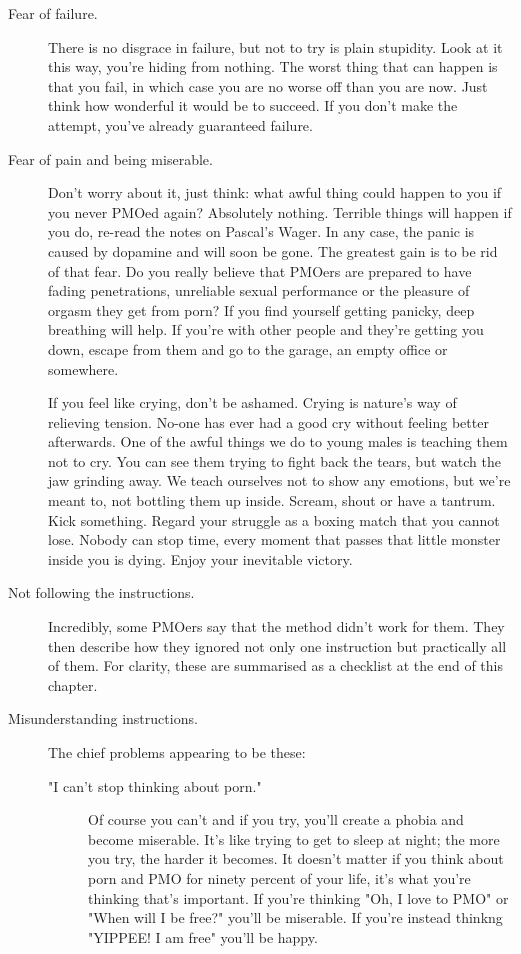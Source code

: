 \documentclass[easypeasy.tex]{subfiles}
\begin{document}
\begin{description}
  \item [Fear of failure.] There is no disgrace in failure, but not to try is plain stupidity. Look at it this way, you're hiding from nothing. The worst thing that can happen is that you fail, in which case you are no worse off than you are now. Just think how wonderful it would be to succeed. If you don't make the attempt, you've already guaranteed failure.

  \item [Fear of pain and being miserable.] Don't worry about it, just think: what awful thing could happen to you if you never PMOed again? Absolutely nothing. Terrible things will happen if you do, re-read the notes on Pascal's Wager. In any case, the panic is caused by dopamine and will soon be gone. The greatest gain is to be rid of that fear. Do you really believe that PMOers are prepared to have fading penetrations, unreliable sexual performance or the pleasure of orgasm they get from porn? If you find yourself getting panicky, deep breathing will help. If you're with other people and they're getting you down, escape from them and go to the garage, an empty office or somewhere.

  If you feel like crying, don't be ashamed. Crying is nature's way of relieving tension. No-one has ever had a good cry without feeling better afterwards. One of the awful things we do to young males is teaching them not to cry. You can see them trying to fight back the tears, but watch the jaw grinding away. We teach ourselves not to show any emotions, but we're meant to, not bottling them up inside. Scream, shout or have a tantrum. Kick something. Regard your struggle as a boxing match that you cannot lose. Nobody can stop time, every moment that passes that little monster inside you is dying. Enjoy your inevitable victory. 

  \item [Not following the instructions.] Incredibly, some PMOers say that the method didn't work for them. They then describe how they ignored not only one instruction but practically all of them. For clarity, these are summarised as a checklist at the end of this chapter.

  \item [Misunderstanding instructions.] The chief problems appearing to be these:

    \begin{description} 
    \item["I can't stop thinking about porn."]
      Of course you can't and if you try, you'll create a phobia and become miserable. It's like trying to get to sleep at night; the more you try, the harder it becomes. It doesn't matter if you think about porn and PMO for ninety percent of your life, it's what you're thinking that's important. If you're thinking "Oh, I love to PMO" or "When will I be free?" you'll be miserable. If you're instead thinkng "YIPPEE! I am free" you'll be happy.


\end{description}
\end{description}
\end{document}
